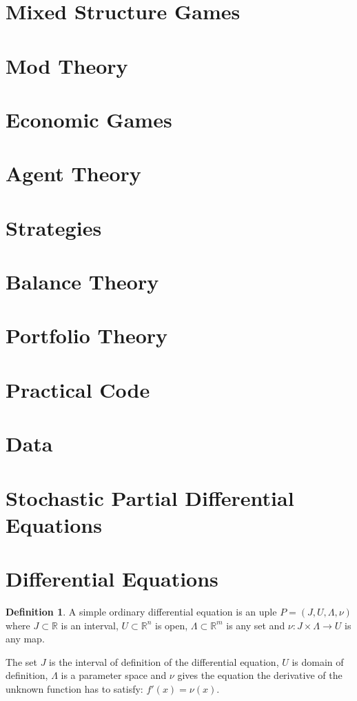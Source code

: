 \documentclass[]{article}
\theoremstyle{definition}
\newtheorem{definition}{Definition}[section]
\theoremstyle{definition}
\newcommand{\raw}{\rightarrow}
\newcommand{\bb}{\mathbb}
\begin{document}
	\section{Mixed Structure Games}
	\section{Mod Theory}
	
	\section{Economic Games}
	\section{Agent Theory}
	\section{Strategies}
	\section{Balance Theory}
	\section{Portfolio Theory}
	\section{Practical Code}
	\section{Data}
	
	\section{Stochastic Partial Differential Equations}
	\section{Differential Equations}
	
	\begin{definition}
		A simple ordinary differential equation is an uple $P = (J, U, \Lambda, \nu)$ where $J \subset \bb{R}$ is an interval, $U \subset \bb{R}^n$ is open, $\Lambda \subset \bb{R}^m$ is any set and $\nu:J \times \Lambda \raw U$ is any map. 
	\end{definition}
	
	The set $J$ is the interval of definition of the differential equation, $U$ is domain of definition, $\Lambda$ is a parameter space and $\nu$ gives the equation the derivative of the unknown function has to satisfy: $f'(x) = \nu(x)$.
	
\end{document}
